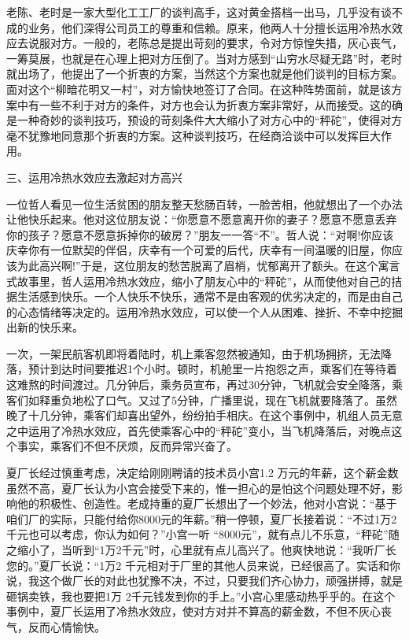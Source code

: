 \documentclass[11pt]{ctexart}
\begin{document}
老陈、老时是一家大型化工工厂的谈判高手，这对黄金搭档一出马，几乎没有谈不成的业务，他们深得公司员工的尊重和信赖。原来，他两人十分擅长运用冷热水效应去说服对方。一般的，老陈总是提出苛刻的要求，令对方惊惶失措，灰心丧气，一筹莫展，也就是在心理上把对方压倒了。当对方感到“山穷水尽疑无路”时，老时就出场了，他提出了一个折衷的方案，当然这个方案也就是他们谈判的目标方案。面对这个“柳暗花明又一村”，对方愉快地签订了合同。在这种阵势面前，就是该方案中有一些不利于对方的条件，对方也会认为折衷方案非常好，从而接受。这的确是一种奇妙的谈判技巧，预设的苛刻条件大大缩小了对方心中的“秤砣”，使得对方毫不犹豫地同意那个折衷的方案。这种谈判技巧，在经商洽谈中可以发挥巨大作用。

三、运用冷热水效应去激起对方高兴

一位哲人看见一位生活贫困的朋友整天愁肠百转，一脸苦相，他就想出了一个办法让他快乐起来。他对这位朋友说：“你愿意不愿意离开你的妻子？愿意不愿意丢弃你的孩子？愿意不愿意拆掉你的破房？”朋友一一答“不”。哲人说：“对啊!你应该庆幸你有一位默契的伴侣，庆幸有一个可爱的后代，庆幸有一间温暖的旧屋，你应该为此高兴啊!”于是，这位朋友的愁苦脱离了眉梢，忧郁离开了额头。在这个寓言式故事里，哲人运用冷热水效应，缩小了朋友心中的“秤砣”，从而使他对自己的拮据生活感到快乐。一个人快乐不快乐，通常不是由客观的优劣决定的，而是由自己的心态情绪等决定的。运用冷热水效应，可以使一个人从困难、挫折、不幸中挖掘出新的快乐来。

一次，一架民航客机即将着陆时，机上乘客忽然被通知，由于机场拥挤，无法降落，预计到达时间要推迟1个小时。顿时，机舱里一片抱怨之声，乘客们在等待着这难熬的时间渡过。几分钟后，乘务员宣布，再过30分钟，飞机就会安全降落，乘客们如释重负地松了口气。又过了5分钟，广播里说，现在飞机就要降落了。虽然晚了十几分钟，乘客们却喜出望外，纷纷拍手相庆。在这个事例中，机组人员无意之中运用了冷热水效应，首先使乘客心中的“秤砣”变小，当飞机降落后，对晚点这个事实，乘客们不但不厌烦，反而异常兴奋了。

夏厂长经过慎重考虑，决定给刚刚聘请的技术员小宫1.2 万元的年薪，这个薪金数虽然不高，夏厂长认为小宫会接受下来的，惟一担心的是怕这个问题处理不好，影响他的积极性、创造性。老成持重的夏厂长想出了一个妙法，他对小宫说：“基于咱们厂的实际，只能付给你8000元的年薪。”稍一停顿，夏厂长接着说：“不过1万2千元也可以考虑，你认为如何？”小宫一听 “8000元”，就有点儿不乐意，“秤砣”随之缩小了，当听到“1万2千元”时，心里就有点儿高兴了。他爽快地说：“我听厂长您的。”夏厂长说：“1万2 千元相对于厂里的其他人员来说，已经很高了。实话和你说，我这个做厂长的对此也犹豫不决，不过，只要我们齐心协力，顽强拼搏，就是砸锅卖铁，我也要把1万 2千元钱发到你的手上。”小宫心里感动热乎乎的。在这个事例中，夏厂长运用了冷热水效应，使对方对并不算高的薪金数，不但不灰心丧气，反而心情愉快。
\end{document}
